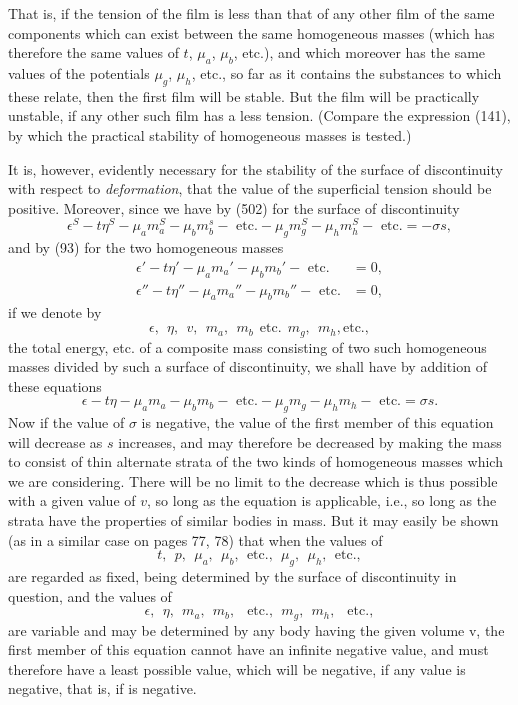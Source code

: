 \documentclass[12pt]{memoir}
\begin{document}
{That is, if the tension of the film is less than that of any other film of the same components which can exist between the same homogeneous masses (which has therefore the same values of $t$, $\mu_a$, $\mu_b$, etc.), and which moreover has the same values of the potentials $\mu_g$, $\mu_h$, etc., so far as it contains the substances to which these relate, then the first film will be stable. But the film will be practically unstable, if any other such film has a less tension. (Compare the expression (141), by which the practical stability of homogeneous masses is tested.)

It is, however, evidently necessary for the stability of the surface of discontinuity with respect to \textit{deformation}, that the value of the superficial tension should be positive. Moreover, since we have by (502) for the surface of discontinuity
$$ \epsilon^S-t\eta^S - \mu_a m_a^S -\mu_b m_b^s - \text{ etc.} - \mu_g m_g^S - \mu_h m_h^S - \text{ etc.} = -\sigma s, $$
and by (93) for the two homogeneous masses
\begin{align*}
\epsilon'-t\eta' - \mu_a m_a' -\mu_b m_b' - \text{ etc.} &=0, \\
\epsilon''-t\eta'' - \mu_a m_a'' -\mu_b m_b'' - \text{ etc.} &= 0, \end{align*}
if we denote by
$$ \epsilon, \ \ \eta, \ \ v, \ \ m_a, \ \  m_b \ \ \text{etc.} \ \ m_g, \ \  m_h, \text{etc.}, $$
the total energy, etc. of a composite mass consisting of two such homogeneous masses divided by such a surface of discontinuity, we shall have by addition of these equations
$$ \epsilon-t\eta - \mu_a m_a -\mu_b m_b - \text{ etc.} - \mu_g m_g - \mu_h m_h - \text{ etc.} = \sigma s.$$
Now if the value of $\sigma$ is negative, the value of the first member of this equation will decrease as $s$ increases, and may therefore be decreased by making the mass to consist of thin alternate strata of the two kinds of homogeneous masses which we are considering. There will be no limit to the decrease which is thus possible with a given value of $v$, so long as the equation is applicable, i.e., so long as the strata have the properties of similar bodies in mass. But it may easily be shown (as in a similar case on pages 77, 78) that when the values of
$$ t, \ \  p, \ \ \mu_a, \ \ \mu_b, \ \ \text{etc.}, \ \ \mu_g, \ \  \mu_h, \ \ \text{etc.}, $$
are regarded as fixed, being determined by the surface of discontinuity in question, and the values of
$$ \epsilon, \ \ \eta, \ \ m_a, \ \ m_b,\ \ \text{ etc.}, \ \ m_g,\ \  m_h,\ \  \text{ etc.},$$
are variable and may be determined by any body having the given volume v, the first member of this equation cannot have an infinite negative value, and must therefore have a least possible value, which will be negative, if any value is negative, that is, if  is negative.


}
\end{document}
